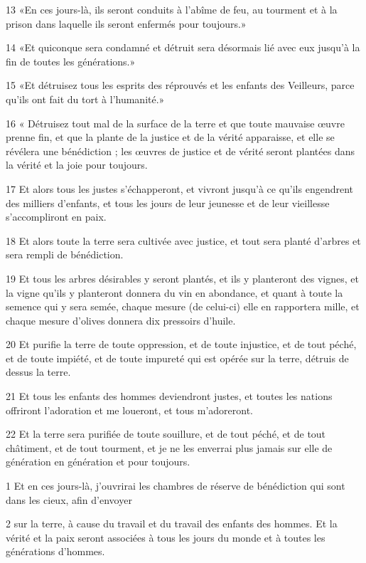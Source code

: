 \par 13 «En ces jours-là, ils seront conduits à l'abîme de feu, au tourment et à la prison dans laquelle ils seront enfermés pour toujours.»
\par 14 «Et quiconque sera condamné et détruit sera désormais lié avec eux jusqu'à la fin de toutes les générations.»
\par 15 «Et détruisez tous les esprits des réprouvés et les enfants des Veilleurs, parce qu'ils ont fait du tort à l'humanité.»
\par 16 « Détruisez tout mal de la surface de la terre et que toute mauvaise œuvre prenne fin, et que la plante de la justice et de la vérité apparaisse, et elle se révélera une bénédiction ; les œuvres de justice et de vérité seront plantées dans la vérité et la joie pour toujours.
\par 17 Et alors tous les justes s'échapperont, et vivront jusqu'à ce qu'ils engendrent des milliers d'enfants, et tous les jours de leur jeunesse et de leur vieillesse s'accompliront en paix.
\par 18 Et alors toute la terre sera cultivée avec justice, et tout sera planté d'arbres et sera rempli de bénédiction.
\par 19 Et tous les arbres désirables y seront plantés, et ils y planteront des vignes, et la vigne qu'ils y planteront donnera du vin en abondance, et quant à toute la semence qui y sera semée, chaque mesure (de celui-ci) elle en rapportera mille, et chaque mesure d'olives donnera dix pressoirs d'huile.
\par 20 Et purifie la terre de toute oppression, et de toute injustice, et de tout péché, et de toute impiété, et de toute impureté qui est opérée sur la terre, détruis de dessus la terre.
\par 21 Et tous les enfants des hommes deviendront justes, et toutes les nations offriront l'adoration et me loueront, et tous m'adoreront.
\par 22 Et la terre sera purifiée de toute souillure, et de tout péché, et de tout châtiment, et de tout tourment, et je ne les enverrai plus jamais sur elle de génération en génération et pour toujours.


\par 1 Et en ces jours-là, j'ouvrirai les chambres de réserve de bénédiction qui sont dans les cieux, afin d'envoyer
\par 2 sur la terre, à cause du travail et du travail des enfants des hommes. Et la vérité et la paix seront associées à tous les jours du monde et à toutes les générations d’hommes.

